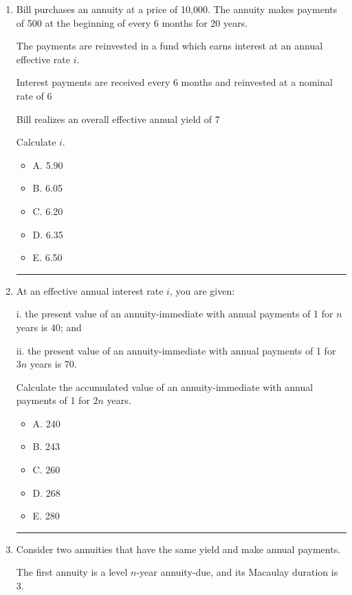 \documentclass[11pt]{article}
\begin{document}
\begin{enumerate}[label=\textbf{\arabic*.}]

\item Bill purchases an annuity at a price of 10,000. The annuity makes payments of 500 at the beginning of every 6 months for 20 years.

The payments are reinvested in a fund which earns interest at an annual effective rate $i$.

Interest payments are received every 6 months and reinvested at a nominal rate of 6%

Bill realizes an overall effective annual yield of 7%

Calculate $i$.

\begin{itemize}
\item A. 5.90%
\item B. 6.05%
\item C. 6.20%
\item D. 6.35%
\item E. 6.50%
\end{itemize}

\medskip
\hrule
\medskip

\item At an effective annual interest rate $i$, you are given:

i. the present value of an annuity-immediate with annual payments of 1 for $n$ years is 40; and

ii. the present value of an annuity-immediate with annual payments of 1 for $3n$ years is 70.

Calculate the accumulated value of an annuity-immediate with annual payments of 1 for $2n$ years.

\begin{itemize}
\item A. 240
\item B. 243
\item C. 260
\item D. 268
\item E. 280
\end{itemize}

\medskip
\hrule
\medskip

\item Consider two annuities that have the same yield and make annual payments.

The first annuity is a level $n$-year annuity-due, and its Macaulay duration is 3.


\end{enumerate}
\end{document}
